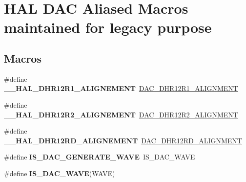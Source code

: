 \hypertarget{group___h_a_l___d_a_c___aliased___macros}{}\section{H\+AL D\+AC Aliased Macros maintained for legacy purpose}
\label{group___h_a_l___d_a_c___aliased___macros}
\subsection*{Macros}
\begin{DoxyCompactItemize}
\item 
\mbox{\label{group___h_a_l___d_a_c___aliased___macros_ga354fd3b8705eea7292d4e4169497da60}} 
\#define {\bfseries \+\_\+\+\_\+\+H\+A\+L\+\_\+\+D\+H\+R12\+R1\+\_\+\+A\+L\+I\+G\+N\+E\+M\+E\+NT}~\mbox{\hyperlink{group___d_a_c___private___macros_gac3ebca33500c1a69df8b9b7ded88a9f5}{D\+A\+C\+\_\+\+D\+H\+R12\+R1\+\_\+\+A\+L\+I\+G\+N\+M\+E\+NT}}
\item 
\mbox{\label{group___h_a_l___d_a_c___aliased___macros_ga2201f928be872705c094e047e49c4b82}} 
\#define {\bfseries \+\_\+\+\_\+\+H\+A\+L\+\_\+\+D\+H\+R12\+R2\+\_\+\+A\+L\+I\+G\+N\+E\+M\+E\+NT}~\mbox{\hyperlink{group___d_a_c___private___macros_ga25186bb99978d84bb1b0103a1a023947}{D\+A\+C\+\_\+\+D\+H\+R12\+R2\+\_\+\+A\+L\+I\+G\+N\+M\+E\+NT}}
\item 
\mbox{\label{group___h_a_l___d_a_c___aliased___macros_ga32958593af3de40d27a9944ab91a7255}} 
\#define {\bfseries \+\_\+\+\_\+\+H\+A\+L\+\_\+\+D\+H\+R12\+R\+D\+\_\+\+A\+L\+I\+G\+N\+E\+M\+E\+NT}~\mbox{\hyperlink{group___d_a_c___private___macros_ga3d35c7e3872d5b79f83a7efdfe3df5f0}{D\+A\+C\+\_\+\+D\+H\+R12\+R\+D\+\_\+\+A\+L\+I\+G\+N\+M\+E\+NT}}
\item 
\mbox{\label{group___h_a_l___d_a_c___aliased___macros_ga71522f902db10a227650387b90a0ae45}} 
\#define {\bfseries I\+S\+\_\+\+D\+A\+C\+\_\+\+G\+E\+N\+E\+R\+A\+T\+E\+\_\+\+W\+A\+VE}~I\+S\+\_\+\+D\+A\+C\+\_\+\+W\+A\+VE
\item 
\#define {\bfseries I\+S\+\_\+\+D\+A\+C\+\_\+\+W\+A\+VE}(W\+A\+VE)
\end{DoxyCompactItemize}


